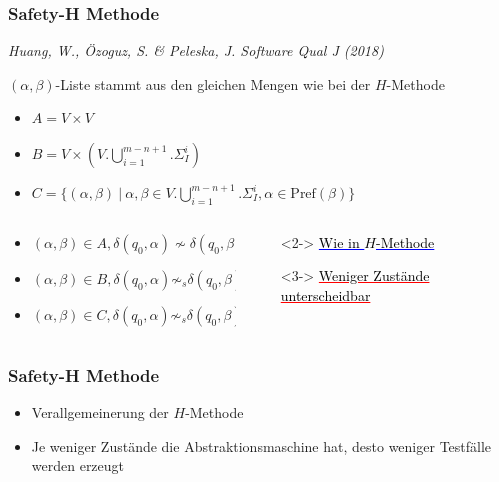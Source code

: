 \begin{frame}

\frametitle{Safety-H Methode}
\begin{center}
  \scriptsize
\emph{Huang, W., Özoguz, S. \& Peleska, J. Software Qual J (2018)}\\
\end{center}
\normalsize
$(\alpha, \beta)$-Liste stammt aus den gleichen Mengen wie bei der $H$-Methode
\begin{itemize}
    \item $A=V\times V$
    \item $B=V\times (V.\bigcup\limits_{i=1}^{m-n+1}.\Sigma_I^i)$
    \item $C=\{(\alpha,\beta)~|~\alpha,\beta\in V.\bigcup\limits_{i=1}^{m-n+1}.\Sigma_I^i, \alpha \in \text{Pref}(\beta)\}$
  \end{itemize}

\begin{columns}[T] %
\begin{column}{.50\textwidth}
\pause
\begin{itemize}
  \item<2-> $(\alpha, \beta) \in A, \delta(q_0,\alpha) \not \sim \delta(q_0, \beta)$
  \item<3-> $(\alpha, \beta) \in B, \delta(q_0,\alpha) \not \sim_s \delta(q_0, \beta)$
  \item<3-> $(\alpha, \beta) \in C, \delta(q_0,\alpha) \not \sim_s \delta(q_0, \beta)$
\end{itemize}
  \end{column}%
  \begin{column}{.60\textwidth}

  \begin{itemize}
  \item[]<2-> \textcolor{blue}{\underline{\textcolor{black}{Wie in $H$-Methode}}}
  \item[]<3-> \textcolor{red}{\underline{\textcolor{black}{Weniger Zustände unterscheidbar}}}
\end{itemize}
\end{column}
\end{columns}

\end{frame}

\begin{frame}
\frametitle{Safety-H Methode}
\begin{itemize}
  \item Verallgemeinerung der $H$-Methode
  \item Je weniger Zustände die Abstraktionsmaschine hat, desto weniger Testfälle werden erzeugt
\end{itemize}
\end{frame}